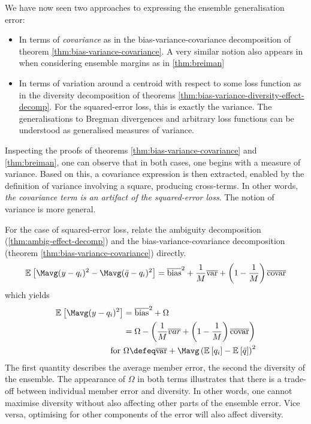 \documentclass[../main.tex]{subfiles}
\begin{document}
We have now seen two approaches to expressing the ensemble generalisation error:
\begin{itemize}
\item In terms of \textit{covariance} as in the bias-variance-covariance decomposition of theorem \ref{thm:bias-variance-covariance}. A very similar notion also appears in when considering ensemble margins as in \ref{thm:breiman}
\item In terms of variation around a centroid with respect to some loss function as in the diversity decomposition of theorems \ref{thm:bias-variance-diversity-effect-decomp}. For the squared-error loss, this is exactly the variance. The generalisations to Bregman divergences and arbitrary loss functions can be understood as generalised measures of variance. 
\end{itemize}
Inspecting the proofs of theorems \ref{thm:bias-variance-covariance} and \ref{thm:breiman}, one can observe that in both cases, one begins with a measure of variance. Based on this, a covariance expression is then extracted, enabled by the definition of variance involving a square, producing cross-terms.
In other words, \textit{the covariance term is an artifact of the squared-error loss}. The notion of variance is more general.

For the case of squared-error loss, \cite{brown_ManagingDiversityRegression_2005} relate the ambiguity decomposition (\ref{thm:ambig-effect-decomp}) and the bias-variance-covariance decomposition (theorem \ref{thm:bias-variance-covariance}) directly. 
\begin{align*}
\mathbb{E}_{}\left[ \Mavg (y - q_{i})^2 - \Mavg (\bar{q} - q_{i})^2 \right]  = \overline{\text{bias} }^2 + \frac{1}{M} \overline{\text{var} } + \left( 1 - \frac{1}{M} \right) \overline{\text{covar} }
\end{align*}
which yields
\begin{align*}
\mathbb{E}_{}\left[ \Mavg (y - q_{i})^2 \right]  &= \overline{\text{bias} }^2 + \Omega \\
&= \Omega - \left( \frac{1}{M}\overline{var} + \left( 1-\frac{1}{M} \right) \overline{\text{covar} } \right) \\
\text{for~}  & \Omega \defeq \overline{\text{var} } + \Mavg \left( \mathbb{E}_{}\left[ q_{i} \right] - \mathbb{E}_{}\left[ \bar{q} \right] \right)^2
\end{align*}
The first quantity describes the average member error, the second the diversity of the ensemble. The appearance of $\Omega$ in both terms illustrates that there is a trade-off between individual member error and diversity. 
In other words, one cannot maximise diversity without also affecting other parts of the ensemble error. Vice versa, optimising for other components of the error will also affect diversity.
\end{document}
